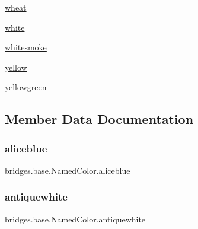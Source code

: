 \begin{DoxyCompactItemize}
\item 
\mbox{\hyperlink{enumbridges_1_1base_1_1_named_color_a93b3cebe6b9ade8be7d4464deeda0247}{wheat}}
\item 
\mbox{\hyperlink{enumbridges_1_1base_1_1_named_color_a1020b159cfe64b5df1c19f1734b5ed34}{white}}
\item 
\mbox{\hyperlink{enumbridges_1_1base_1_1_named_color_aec573e4f20721fb6660fade7a4fcdae7}{whitesmoke}}
\item 
\mbox{\hyperlink{enumbridges_1_1base_1_1_named_color_aaecc9a80f5e566148c7d448424532d95}{yellow}}
\item 
\mbox{\hyperlink{enumbridges_1_1base_1_1_named_color_a263dc51f00db00ef12d4f24cc2c6ee5c}{yellowgreen}}
\end{DoxyCompactItemize}


\subsection{Member Data Documentation}
\mbox{\label{enumbridges_1_1base_1_1_named_color_a8d2d3904e6e7f1f6a144365d6fae6b92}} 
\subsubsection{\texorpdfstring{aliceblue}{aliceblue}}
{\footnotesize\ttfamily bridges.\+base.\+Named\+Color.\+aliceblue}

\mbox{\label{enumbridges_1_1base_1_1_named_color_a49d6e6cad9f1f9c88e2c59eafa78c45c}} 
\subsubsection{\texorpdfstring{antiquewhite}{antiquewhite}}
{\footnotesize\ttfamily bridges.\+base.\+Named\+Color.\+antiquewhite}

\mbox{\label{enumbridges_1_1base_1_1_named_color_afe730da1bd9445649a3bb994d3ae6363}} 
